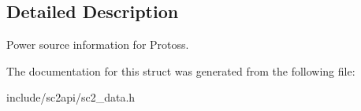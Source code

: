 \subsection{Detailed Description}
Power source information for Protoss. 

The documentation for this struct was generated from the following file\+:\begin{DoxyCompactItemize}
\item 
include/sc2api/sc2\+\_\+data.\+h\end{DoxyCompactItemize}
